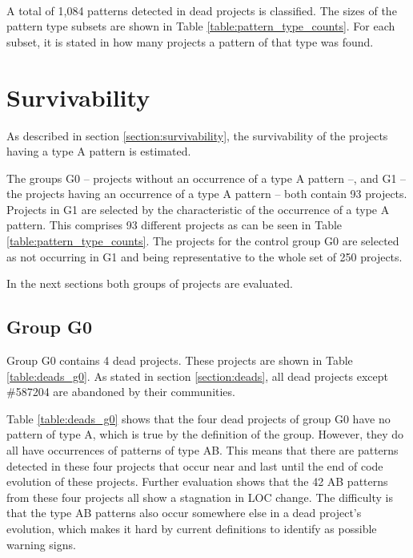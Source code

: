 \paragraph{}
A total of 1,084 patterns detected in dead projects is classified. The sizes of
the pattern type subsets are shown in Table \ref{table:pattern_type_counts}.
For each subset, it is stated in how many projects a pattern of that type was
found.



\section{Survivability}
As described in section \ref{section:survivability}, the survivability of the
projects having a type A pattern is estimated.

The groups G0 -- projects without an occurrence of a type A pattern --, and G1
-- the projects having an occurrence of a type A pattern -- both contain 93
projects. Projects in G1 are selected by the characteristic of the occurrence
of a type A pattern. This comprises 93 different projects as can be seen in
Table \ref{table:pattern_type_counts}. The projects for the control group G0
are selected as not occurring in G1 and being representative to the whole set
of 250 projects.

In the next sections both groups of projects are evaluated.

\subsection{Group G0}
\label{section:group_g0}
Group G0 contains 4 dead projects. These projects are shown in Table
\ref{table:deads_g0}. As stated in section \ref{section:deads}, all dead
projects except \#587204 are abandoned by their communities.



\noindent
Table \ref{table:deads_g0} shows that the four dead projects of group G0 have
no pattern of type A, which is true by the definition of the group. However,
they do all have occurrences of patterns of type AB. This means that there are
patterns detected in these four projects that occur near and last until the end
of code evolution of these projects. Further evaluation shows that the 42 AB
patterns from these four projects all show a stagnation in LOC change. The
difficulty is that the type AB patterns also occur somewhere else in a dead
project's evolution, which makes it hard by current definitions to identify as
possible warning signs.

